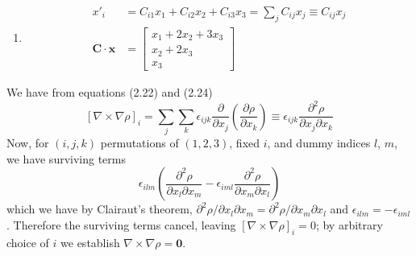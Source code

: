 \documentclass[a4paper]{article}
\begin{document}
\begin{enumerate}[label=\alph*.]
	\item \begin{align*}
		x'_{i} & = C_{i1}x_{1} + C_{i2}x_{2} + C_{i3}x_{3} = \sum_{j} C_{ij}x_{j} \equiv C_{ij}x_{j} \\
		\pmb{C} \cdot \pmb{x} & = \begin{bmatrix}
			x_{1} + 2x_{2} + 3x_{3} \\
			x_{2} + 2x_{3} \\
			x_{3}
		\end{bmatrix}
	\end{align*}
\end{enumerate}


We have from equations (2.22) and (2.24)
\[
	\!\left[ \nabla \times \nabla \rho \right]_{i} = \sum_{j} \sum_{k} \epsilon_{ijk}\frac{\partial }{\partial x_{j}}\!\left( \frac{\partial \rho}{\partial x_{k}} \right) \equiv \epsilon_{ijk}\frac{\partial^2 \rho}{\partial x_{j} \partial x_{k}}
\]
Now, for \( \!\left( i,j,k \right) \) permutations of \( \!\left( 1,2,3 \right) \), fixed \( i \), and dummy indices \( l \), \( m \), we have surviving terms 
\[ 
	\epsilon_{ilm}\!\left( \frac{\partial^{2}\rho}{\partial x_{l}\partial x_{m}} - \epsilon_{iml}\frac{\partial^{2}\rho}{\partial x_{m}\partial x_{l}} \right)
\]
which we have by Clairaut's theorem, \( \partial^{2}\rho / \partial x_{l}\partial x_{m} = \partial^{2}\rho / \partial x_{m}\partial x_{l} \) and \( \epsilon_{ilm} = -\epsilon_{iml} \). Therefore the surviving terms cancel, leaving \( \!\left[ \nabla \times \nabla \rho \right]_{i} = 0 \); by arbitrary choice of \( i \) we establish \( \nabla \times \nabla \rho = \pmb{0} \).

\end{document}
